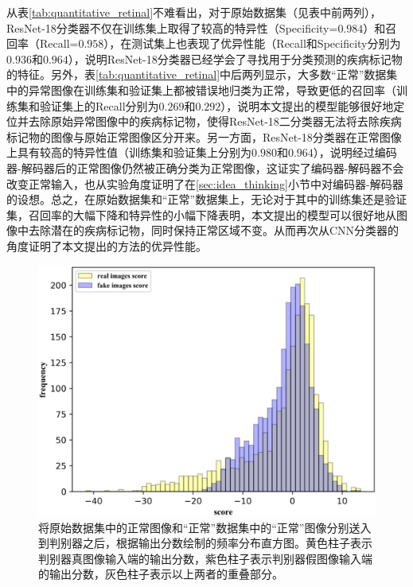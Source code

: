从表\ref{tab:quantitative_retinal}不难看出，对于原始数据集（见表中前两列），ResNet-18分类器不仅在训练集上取得了较高的特异性（Specificity=$0.984$）和召回率（Recall=$0.958$），在测试集上也表现了优异性能（Recall和Specificity分别为$0.936$和$0.964$），说明ResNet-18分类器已经学会了寻找用于分类预测的疾病标记物的特征。另外，表\ref{tab:quantitative_retinal}中后两列显示，大多数“正常”数据集中的异常图像在训练集和验证集上都被错误地归类为正常，导致更低的召回率（训练集和验证集上的Recall分别为$0.269$和$0.292$），说明本文提出的模型能够很好地定位并去除原始异常图像中的疾病标记物，使得ResNet-18二分类器无法将去除疾病标记物的图像与原始正常图像区分开来。另一方面，ResNet-18分类器在正常图像上具有较高的特异性值（训练集和验证集上分别为$0.980$和$0.964$），说明经过编码器-解码器后的正常图像仍然被正确分类为正常图像，这证实了编码器-解码器不会改变正常输入，也从实验角度证明了在\ref{sec:idea_thinking}小节中对编码器-解码器的设想。总之，在原始数据集和“正常”数据集上，无论对于其中的训练集还是验证集，召回率的大幅下降和特异性的小幅下降表明，本文提出的模型可以很好地从图像中去除潜在的疾病标记物，同时保持正常区域不变。从而再次从CNN分类器的角度证明了本文提出的方法的优异性能。
\begin{figure}[h]
	\centering
	\includegraphics[width=1.0\textwidth]{figure/score_distribution.png}
	\caption{将原始数据集中的正常图像和“正常”数据集中的“正常”图像分别送入到判别器之后，根据输出分数绘制的频率分布直方图。黄色柱子表示判别器真图像输入端的输出分数，紫色柱子表示判别器假图像输入端的输出分数，灰色柱子表示以上两者的重叠部分。}
	\label{fig:hist_freq}
\end{figure}

